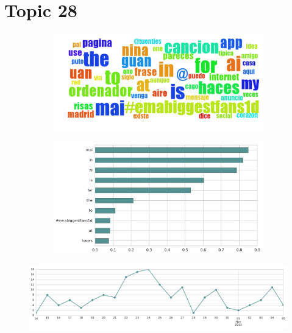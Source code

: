 \section{Topic 28}

\begin{figure}[htbp!]
    \centering
    \begin{subfigure}[b]{0.49\textwidth}
        \includegraphics[width=\textwidth]{twitter_all/report_images/topic-28-wordcloud.jpg}
    \end{subfigure}
    \begin{subfigure}[b]{0.49\textwidth}
        \includegraphics[width=\textwidth]{twitter_all/report_images/topic-28-terms.jpg}
    \end{subfigure}
\end{figure}

\begin{figure}[htbp!]
    \centering
    \includegraphics[width=\textwidth]{twitter_all/report_images/topic-28-timeseries.jpg}
\end{figure}

